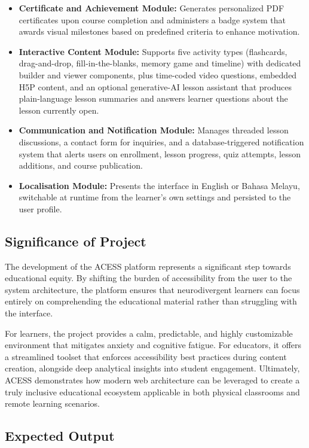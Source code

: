 \documentclass[12pt, oneside]{article} %
\begin{document}
\begin{itemize}
    \item \textbf{Certificate and Achievement Module:} Generates personalized PDF certificates upon course completion and administers a badge system that awards visual milestones based on predefined criteria to enhance motivation.
    \item \textbf{Interactive Content Module:} Supports five activity types (flashcards, drag-and-drop, fill-in-the-blanks, memory game and timeline) with dedicated builder and viewer components, plus time-coded video questions, embedded H5P content, and an optional generative-AI lesson assistant that produces plain-language lesson summaries and answers learner questions about the lesson currently open.
    \item \textbf{Communication and Notification Module:} Manages threaded lesson discussions, a contact form for inquiries, and a database-triggered notification system that alerts users on enrollment, lesson progress, quiz attempts, lesson additions, and course publication.
    \item \textbf{Localisation Module:} Presents the interface in English or Bahasa Melayu, switchable at runtime from the learner's own settings and persisted to the user profile.
\end{itemize}

\subsection{Significance of Project}

The development of the ACESS platform represents a significant step towards educational equity. By shifting the burden of accessibility from the user to the system architecture, the platform ensures that neurodivergent learners can focus entirely on comprehending the educational material rather than struggling with the interface.

For learners, the project provides a calm, predictable, and highly customizable environment that mitigates anxiety and cognitive fatigue. For educators, it offers a streamlined toolset that enforces accessibility best practices during content creation, alongside deep analytical insights into student engagement. Ultimately, ACESS demonstrates how modern web architecture can be leveraged to create a truly inclusive educational ecosystem applicable in both physical classrooms and remote learning scenarios.

\subsection{Expected Output}
\end{document}
